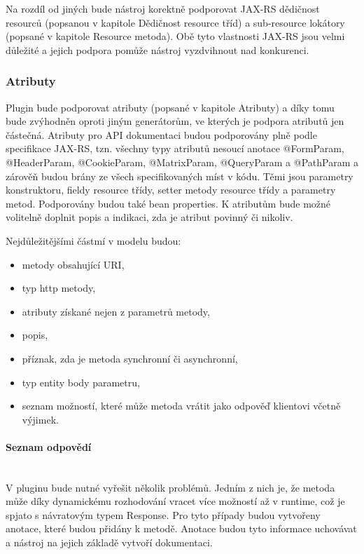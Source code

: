 \documentclass[11pt,twoside,a4paper]{book}
\begin{document}
Na rozdíl od jiných bude nástroj korektně podporovat JAX-RS dědičnost resourců (popsanou
v kapitole Dědičnost resource tříd) a sub-resource lokátory (popsané v kapitole Resource
metoda). Obě tyto vlastnosti JAX-RS jsou velmi důležité a jejich podpora pomůže nástroj
vyzdvihnout nad konkurenci.

\subsubsection{Atributy}

Plugin bude podporovat atributy (popsané v kapitole Atributy) a díky tomu bude zvýhodněn
oproti jiným generátorům, ve kterých je podpora atributů jen částečná. Atributy pro API
dokumentaci budou podporovány plně podle specifikace JAX-RS, tzn. všechny typy atributů
nesoucí anotace @FormParam, @HeaderParam, @CookieParam, @MatrixParam,
@QueryParam a @PathParam a zárověň budou brány ze všech specifikovaných míst v
kódu. Těmi jsou parametry konstruktoru, fieldy resource třídy, setter metody resource třídy a
parametry metod. Podporovány budou také bean properties. K atributům bude možné
volitelně doplnit popis a indikaci, zda je atribut povinný či nikoliv.

Nejdůležitějšími částmí v modelu budou:
\begin{itemize}
  \item metody obsahující URI,
  \item typ http metody,
  \item atributy získané nejen z parametrů metody,
  \item popis,
  \item příznak, zda je metoda synchronní či asynchronní,
  \item typ entity body parametru,
  \item seznam možností, které může metoda vrátit jako odpověď klientovi včetně
  výjimek.
\end{itemize}

\paragraph{Seznam odpovědí}
\mbox{}\\

V pluginu bude nutné vyřešit několik problémů. Jedním z nich je, že metoda může díky
dynamickému rozhodování vracet více možností až v runtime, což je spjato s návratovým
typem Response. Pro tyto případy budou vytvořeny anotace, které budou přidány k metodě.
Anotace budou tyto informace uchovávat a nástroj na jejich základě vytvoří dokumentaci.
\end{document}

